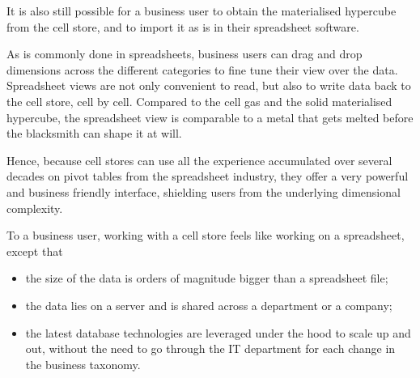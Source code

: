 \documentclass{acm_proc_article-sp}
\begin{document}
It is also still possible for a business user to obtain the materialised hypercube from the cell store, and to import it as is in their spreadsheet software.

As is commonly done in spreadsheets, business users can drag and drop dimensions across the different categories to fine tune their view over the data. Spreadsheet views are not only convenient to read, but also to write data back to the cell store, cell by cell. Compared to the cell gas and the solid materialised hypercube, the spreadsheet view is comparable to a metal that gets melted before the blacksmith can shape it at will.

Hence, because cell stores can use all the experience accumulated over several decades on pivot tables from the spreadsheet industry, they offer a very powerful and business friendly interface, shielding users from the underlying dimensional complexity.

To a business user, working with a cell store feels like working on a spreadsheet, except that

\begin{itemize}
\item the size of the data is orders of magnitude bigger than a spreadsheet file;
\item the data lies on a server and is shared across a department or a company;
\item the latest database technologies are leveraged under the hood to scale up and out, without the need to go through the IT department for each change in the business taxonomy.
\end{itemize}
\end{document}
